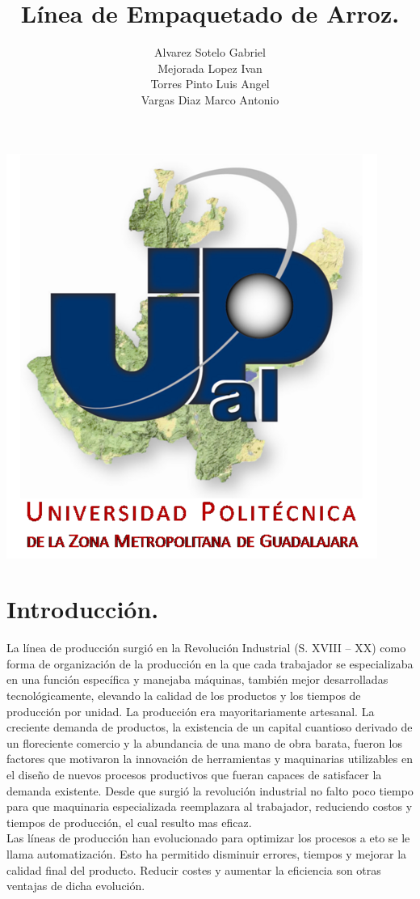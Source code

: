 \documentclass[10pt,a4paper]{article}
\title{Línea de Empaquetado de Arroz.}
\author{Alvarez Sotelo Gabriel\\Mejorada Lopez Ivan\\Torres Pinto Luis Angel\\Vargas Diaz Marco Antonio}
\begin{document}
\maketitle
\centering
\includegraphics[scale=1.90]{upzmg.jpg}\\ 
\raggedright
\newpage
\section{Introducción.}
La línea de producción surgió en la Revolución Industrial (S. XVIII – XX) como forma de organización de la producción en la que cada trabajador se especializaba en una función específica y manejaba máquinas, también mejor desarrolladas tecnológicamente, elevando la calidad de los productos y los tiempos de producción por unidad. La producción era mayoritariamente artesanal. La creciente demanda de productos, la existencia de un capital cuantioso derivado de un floreciente comercio y la abundancia de una mano de obra barata, fueron los factores que motivaron la innovación de herramientas y maquinarias utilizables en el diseño de nuevos procesos productivos que fueran capaces de satisfacer la demanda existente. 
Desde que surgió la revolución industrial no falto poco tiempo para que maquinaria especializada reemplazara al trabajador, reduciendo costos y tiempos de producción, el cual resulto mas eficaz.\\ 
Las líneas de producción han evolucionado para optimizar los procesos a eto se le llama automatización. Esto ha permitido disminuir errores, tiempos y mejorar la calidad final del producto. Reducir costes y aumentar la eficiencia son otras ventajas de dicha evolución. 
\\
\end{document}
